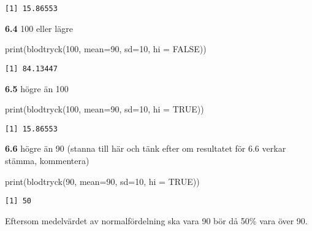 \documentclass[
  letterpaper,
  DIV=11,
  numbers=noendperiod]{scrartcl}
\newenvironment{Shaded}{\begin{snugshade}}{\end{snugshade}}
\newcommand{\AttributeTok}[1]{\textcolor[rgb]{0.40,0.45,0.13}{#1}}
\newcommand{\ConstantTok}[1]{\textcolor[rgb]{0.56,0.35,0.01}{#1}}
\newcommand{\DecValTok}[1]{\textcolor[rgb]{0.68,0.00,0.00}{#1}}
\newcommand{\FunctionTok}[1]{\textcolor[rgb]{0.28,0.35,0.67}{#1}}
\newcommand{\NormalTok}[1]{\textcolor[rgb]{0.00,0.23,0.31}{#1}}
\begin{document}
\begin{verbatim}
[1] 15.86553
\end{verbatim}

\textbf{6.4} 100 eller lägre

\begin{Shaded}
\begin{Highlighting}[]
\FunctionTok{print}\NormalTok{(}\FunctionTok{blodtryck}\NormalTok{(}\DecValTok{100}\NormalTok{, }\AttributeTok{mean=}\DecValTok{90}\NormalTok{, }\AttributeTok{sd=}\DecValTok{10}\NormalTok{, }\AttributeTok{hi =} \ConstantTok{FALSE}\NormalTok{))}
\end{Highlighting}
\end{Shaded}

\begin{verbatim}
[1] 84.13447
\end{verbatim}

\textbf{6.5} högre än 100

\begin{Shaded}
\begin{Highlighting}[]
\FunctionTok{print}\NormalTok{(}\FunctionTok{blodtryck}\NormalTok{(}\DecValTok{100}\NormalTok{, }\AttributeTok{mean=}\DecValTok{90}\NormalTok{, }\AttributeTok{sd=}\DecValTok{10}\NormalTok{, }\AttributeTok{hi =} \ConstantTok{TRUE}\NormalTok{))}
\end{Highlighting}
\end{Shaded}

\begin{verbatim}
[1] 15.86553
\end{verbatim}

\textbf{6.6} högre än 90 (stanna till här och tänk efter om resultatet
för 6.6 verkar stämma, kommentera)

\begin{Shaded}
\begin{Highlighting}[]
\FunctionTok{print}\NormalTok{(}\FunctionTok{blodtryck}\NormalTok{(}\DecValTok{90}\NormalTok{, }\AttributeTok{mean=}\DecValTok{90}\NormalTok{, }\AttributeTok{sd=}\DecValTok{10}\NormalTok{, }\AttributeTok{hi =} \ConstantTok{TRUE}\NormalTok{))}
\end{Highlighting}
\end{Shaded}

\begin{verbatim}
[1] 50
\end{verbatim}

Eftersom medelvärdet av normalfördelning ska vara 90 bör då 50\% vara
över 90.
\end{document}
